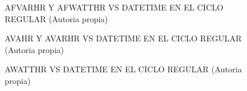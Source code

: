 \begin{figure}[H]
  \hfill
  \hfill
  \hfill
  \caption{AFVARHR Y AFWATTHR VS DATETIME EN EL CICLO REGULAR (Autoria propia)}
  \end{figure}
\begin{figure}[H]
  \hfill
  \hfill
  \hfill
  \caption{AVAHR Y AVARHR VS DATETIME EN EL CICLO REGULAR (Autoria propia)}
  \end{figure}
\begin{figure}[H]
  \hfill
  \hfill
  \caption{AWATTHR VS DATETIME EN EL CICLO REGULAR (Autoria propia)}
  \end{figure}
